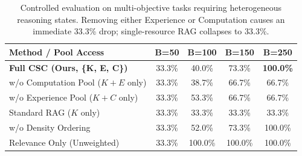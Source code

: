 \begin{table}[t]
\centering
\small
\begin{tabular}{lcccc}
\toprule
\textbf{Method / Pool Access} & \textbf{B=50} & \textbf{B=100} & \textbf{B=150} & \textbf{B=250} \\
\midrule
\textbf{Full CSC (Ours, \{K, E, C\})} & 33.3\% & 40.0\% & 73.3\% & \textbf{100.0\%} \\
w/o Computation Pool ($K+E$ only) & 33.3\% & 38.7\% & 66.7\% & 66.7\% \\
w/o Experience Pool ($K+C$ only) & 33.3\% & 53.3\% & 66.7\% & 66.7\% \\
Standard RAG ($K$ only) & 33.3\% & 33.3\% & 33.3\% & 33.3\% \\
w/o Density Ordering & 33.3\% & 52.0\% & 73.3\% & 100.0\% \\
Relevance Only (Unweighted) & 33.3\% & 100.0\% & 100.0\% & 100.0\% \\
\bottomrule
\end{tabular}
\caption{Controlled evaluation on multi-objective tasks requiring heterogeneous reasoning states. Removing either Experience or Computation causes an immediate 33.3\% drop; single-resource RAG collapses to 33.3\%.}
\label{tab:cross_resource_necessity}
\end{table}